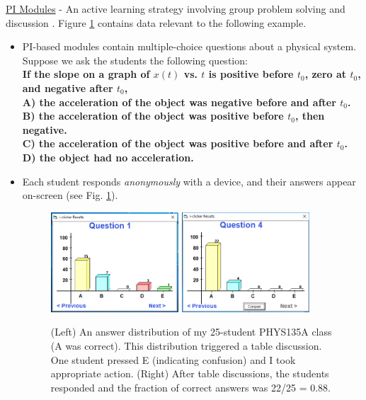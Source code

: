 \documentclass[../../../main.tex]{subfiles}
\begin{document}
\underline{PI Modules} - An active learning strategy involving group problem solving and discussion \cite{mazur2013peer} \cite{AAPTPI} \cite{PhysPort}.  Figure \ref{fig:exampleData} contains data relevant to the following example.
\begin{itemize}
\item PI-based modules contain multiple-choice questions about a physical system.  Suppose we ask the students the following question: \\ \vspace{0.5cm} \textbf{If the slope on a graph of $x(t)$ vs. $t$ is positive before $t_0$, zero at $t_0$, and negative after $t_0$, \\ \vspace{0.5cm} A) the acceleration of the object was negative before and after $t_0$.  \\ B) the acceleration of the object was positive before $t_0$, then negative. \\ C) the acceleration of the object was positive before and after $t_0$. \\ D) the object had no acceleration.}
\item Each student responds \textit{anonymously} with a device, and their answers appear on-screen (see Fig. \ref{fig:exampleData}).
\begin{figure}
\centering
\includegraphics[width=0.45\textwidth,trim=0.25cm 1cm 0.15cm 2cm,clip=true]{FirstData.PNG}
\includegraphics[width=0.45\textwidth,trim=0.25cm 1cm 0.15cm 2cm,clip=true]{SecondData.PNG}
\caption{\label{fig:exampleData} (Left) An answer distribution of my 25-student PHYS135A class (A was correct).  This distribution triggered a table discussion.  One student pressed E (indicating confusion) and I took appropriate action.  (Right) After table discussions, the students responded and the fraction of correct answers was 22/25 = 0.88.}

\end{figure}
\end{itemize}
\end{document}
